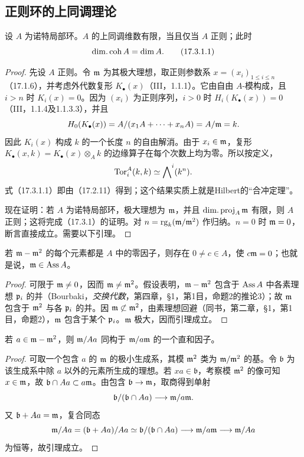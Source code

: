 \subsection{正则环的上同调理论}

设 $A$ 为诺特局部环。$A$ 的上同调维数有限，当且仅当 $A$ 正则；此时
\begin{equation}
 \operatorname{dim.coh} A=\dim A.
 \tag{17.3.1.1}
\end{equation}
\begin{proof}
先设 $A$ 正则。令 $\mathfrak m$ 为其极大理想，取正则参数系
$x=(x_i)_{1\leq i\leq n}$（17.1.6），并考虑外代数复形 $K_\bullet(x)$（III，1.1.1）。它由自由 $A$-模构成，且 $i>n$ 时 $K_i(x)=0$。因为 $(x_i)$ 为正则序列，$i>0$ 时
$H_i(K_\bullet(x))=0$（III，1.1.4及1.1.3.3），并且
\[
 H_0(K_\bullet(x))=A/(x_1A+\cdots+x_nA)=A/\mathfrak m=k.
\]
因此 $K_i(x)$ 构成 $k$ 的一个长度 $n$ 的自由解消。由于 $x_i\in\mathfrak m$，复形
$K_\bullet(x,k)=K_\bullet(x)\otimes_A k$ 的边缘算子在每个次数上均为零。所以按定义，
\[
 \operatorname{Tor}_i^A(k,k)\simeq\bigwedge\nolimits^i(k^n).
\]
式（17.3.1.1）即由（17.2.11）得到；这个结果实质上就是Hilbert的“合冲定理”。

现在证明：若 $A$ 为诺特局部环，极大理想为 $\mathfrak m$，并且 $\operatorname{dim.proj}_A\mathfrak m$ 有限，则 $A$ 正则；这将完成（17.3.1）的证明。对 $n=\operatorname{rg}_k(\mathfrak m/\mathfrak m^2)$ 作归纳。$n=0$ 时 $\mathfrak m=0$，断言直接成立。需要以下引理。
\renewcommand{\qedsymbol}{}
\end{proof}

若 $\mathfrak m-\mathfrak m^2$ 的每个元素都是 $A$ 中的零因子，则存在 $0\ne c\in A$，使 $c\mathfrak m=0$；也就是说，$\mathfrak m\in\operatorname{Ass} A$。
\begin{proof}
可限于 $\mathfrak m\ne0$，因而 $\mathfrak m\ne\mathfrak m^2$。假设表明，$\mathfrak m-\mathfrak m^2$ 包含于 $\operatorname{Ass} A$ 中各素理想 $\mathfrak p_i$ 的并（Bourbaki，\textit{交换代数}，第四章，§1，第1目，命题2的推论3）；故 $\mathfrak m$ 包含于 $\mathfrak m^2$ 与各 $\mathfrak p_i$ 的并。因 $\mathfrak m\not\subset\mathfrak m^2$，由素理想回避（同书，第二章，§1，第1目，命题2），$\mathfrak m$ 包含于某个 $\mathfrak p_i$。$\mathfrak m$ 极大，因而引理成立。
\end{proof}

若 $a\in\mathfrak m-\mathfrak m^2$，则 $\mathfrak m/Aa$ 同构于 $\mathfrak m/a\mathfrak m$ 的一个直和因子。
\begin{proof}
可取一个包含 $a$ 的 $\mathfrak m$ 的极小生成系，其模 $\mathfrak m^2$ 类为 $\mathfrak m/\mathfrak m^2$ 的基。令 $\mathfrak b$ 为该生成系中除 $a$ 以外的元素所生成的理想。若 $xa\in\mathfrak b$，考察模 $\mathfrak m^2$ 的像可知 $x\in\mathfrak m$，故
$\mathfrak b\cap Aa\subset a\mathfrak m$。由包含 $\mathfrak b\to\mathfrak m$，取商得到单射
\[
 \mathfrak b/(\mathfrak b\cap Aa)\longrightarrow\mathfrak m/a\mathfrak m.
\]
又 $\mathfrak b+Aa=\mathfrak m$，复合同态
\[
 \mathfrak m/Aa=(\mathfrak b+Aa)/Aa
 \simeq\mathfrak b/(\mathfrak b\cap Aa)
 \longrightarrow\mathfrak m/a\mathfrak m\longrightarrow\mathfrak m/Aa
\]
为恒等，故引理成立。
\end{proof}

